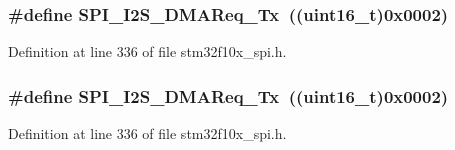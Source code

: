 \subsubsection[{\texorpdfstring{S\+P\+I\+\_\+\+I2\+S\+\_\+\+D\+M\+A\+Req\+\_\+\+Tx}{SPI_I2S_DMAReq_Tx}}]{\setlength{\rightskip}{0pt plus 5cm}\#define S\+P\+I\+\_\+\+I2\+S\+\_\+\+D\+M\+A\+Req\+\_\+\+Tx~(({\bf uint16\+\_\+t})0x0002)}\hypertarget{group___s_p_i___i2_s___d_m_a__transfer__requests_ga05f55a18c83aaa945d99200d012e5e2a}{}\label{group___s_p_i___i2_s___d_m_a__transfer__requests_ga05f55a18c83aaa945d99200d012e5e2a}


Definition at line 336 of file stm32f10x\+\_\+spi.\+h.

\subsubsection[{\texorpdfstring{S\+P\+I\+\_\+\+I2\+S\+\_\+\+D\+M\+A\+Req\+\_\+\+Tx}{SPI_I2S_DMAReq_Tx}}]{\setlength{\rightskip}{0pt plus 5cm}\#define S\+P\+I\+\_\+\+I2\+S\+\_\+\+D\+M\+A\+Req\+\_\+\+Tx~(({\bf uint16\+\_\+t})0x0002)}\hypertarget{group___s_p_i___i2_s___d_m_a__transfer__requests_ga05f55a18c83aaa945d99200d012e5e2a}{}\label{group___s_p_i___i2_s___d_m_a__transfer__requests_ga05f55a18c83aaa945d99200d012e5e2a}


Definition at line 336 of file stm32f10x\+\_\+spi.\+h.


